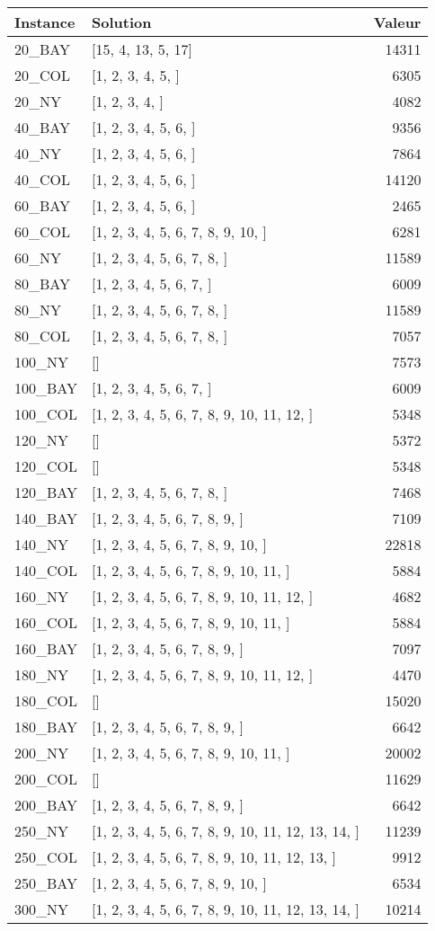 \documentclass[main.tex]{subfiles}
\begin{document}
\begin{center}
\renewcommand{\arraystretch}{1.4} 
\begin{tabular}{llr}\hline
\textbf{Instance} & \textbf{Solution} & \textbf{Valeur} \\\hline

20\_BAY & [15, 4, 13, 5, 17] & 14311\\
20\_COL & [1, 2, 3, 4, 5, ] & 6305\\
20\_NY & [1, 2, 3, 4, ] & 4082\\
40\_BAY & [1, 2, 3, 4, 5, 6, ] & 9356\\
40\_NY & [1, 2, 3, 4, 5, 6, ] & 7864\\
40\_COL & [1, 2, 3, 4, 5, 6, ] & 14120\\
60\_BAY & [1, 2, 3, 4, 5, 6, ] & 2465\\
60\_COL & [1, 2, 3, 4, 5, 6, 7, 8, 9, 10, ] & 6281\\
60\_NY & [1, 2, 3, 4, 5, 6, 7, 8, ] & 11589\\
80\_BAY & [1, 2, 3, 4, 5, 6, 7, ] & 6009\\
80\_NY & [1, 2, 3, 4, 5, 6, 7, 8, ] & 11589\\
80\_COL & [1, 2, 3, 4, 5, 6, 7, 8, ] & 7057\\
100\_NY & [] & 7573\\
100\_BAY & [1, 2, 3, 4, 5, 6, 7, ] & 6009\\
100\_COL & [1, 2, 3, 4, 5, 6, 7, 8, 9, 10, 11, 12, ] & 5348\\
120\_NY & [] & 5372\\
120\_COL & [] & 5348\\
120\_BAY & [1, 2, 3, 4, 5, 6, 7, 8, ] & 7468\\
140\_BAY & [1, 2, 3, 4, 5, 6, 7, 8, 9, ] & 7109\\
140\_NY & [1, 2, 3, 4, 5, 6, 7, 8, 9, 10, ] & 22818\\
140\_COL & [1, 2, 3, 4, 5, 6, 7, 8, 9, 10, 11, ] & 5884\\
160\_NY & [1, 2, 3, 4, 5, 6, 7, 8, 9, 10, 11, 12, ] & 4682\\
160\_COL & [1, 2, 3, 4, 5, 6, 7, 8, 9, 10, 11, ] & 5884\\
160\_BAY & [1, 2, 3, 4, 5, 6, 7, 8, 9, ] & 7097\\
180\_NY & [1, 2, 3, 4, 5, 6, 7, 8, 9, 10, 11, 12, ] & 4470\\
180\_COL & [] & 15020\\
180\_BAY & [1, 2, 3, 4, 5, 6, 7, 8, 9, ] & 6642\\
200\_NY & [1, 2, 3, 4, 5, 6, 7, 8, 9, 10, 11, ] & 20002\\
200\_COL & [] & 11629\\
200\_BAY & [1, 2, 3, 4, 5, 6, 7, 8, 9, ] & 6642\\
250\_NY & [1, 2, 3, 4, 5, 6, 7, 8, 9, 10, 11, 12, 13, 14, ] & 11239\\
250\_COL & [1, 2, 3, 4, 5, 6, 7, 8, 9, 10, 11, 12, 13, ] & 9912\\
250\_BAY & [1, 2, 3, 4, 5, 6, 7, 8, 9, 10, ] & 6534\\
300\_NY & [1, 2, 3, 4, 5, 6, 7, 8, 9, 10, 11, 12, 13, 14, ] & 10214\\
\hline\end{tabular}
\end{center}
\end{document}
